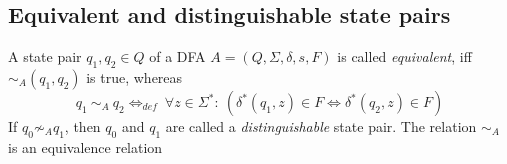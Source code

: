 \subsection{Equivalent and distinguishable state pairs}

\begin{definition}\cite[p. 154]{HMU01}
	A state pair $q_1, q_2 \in Q$ of a DFA $A = (Q, \Sigma, \delta, s, F)$ is called \emph{equivalent}, iff $\sim_A(q_1, q_2)$ is true, whereas
	\begin{displaymath}
	q_1\ \sim_A\ q_2 \Leftrightarrow_{def}\ \forall z \in \Sigma^* \colon\ (\delta^*(q_1, z) \in F \Leftrightarrow \delta^*(q_2, z) \in F)
	\end{displaymath}
	If $q_0 \not\sim_A q_1$, then $q_0$ and $q_1$ are called a \emph{distinguishable} state pair. The relation $\sim_A$ is an equivalence relation
\end{definition}
